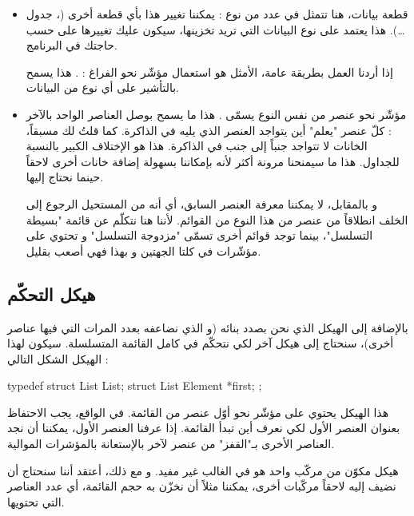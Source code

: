 \begin{itemize}
	\item قطعة بيانات، هنا تتمثل في عدد من نوع 
	 :
	يمكننا تغيير هذا بأي قطعة أخرى
	(،
	جدول \dots). هذا يعتمد على نوع البيانات التي تريد تخزينها، سيكون عليك تغييرها على حسب حاجتك في البرنامج.
	
	\begin{information}
		إذا أردنا العمل بطريقة عامة، الأمثل هو استعمال مؤشّر نحو الفراغ :
		.
		هذا يسمح بالتأشير على أي نوع من البيانات.
	\end{information}
	\item مؤشّر نحو عنصر من نفس النوع يسمّى
	\InlineCode{next}.
	هذا ما يسمح بوصل العناصر الواحد بالآخر : كلّ عنصر "يعلم" أين يتواجد العنصر الذي يليه في الذاكرة. كما قلتُ لك مسبقاً، الخانات لا تتواجد جنباً إلى جنب في الذاكرة. هذا هو الإختلاف الكبير بالنسبة للجداول. هذا ما سيمنحنا مرونة أكثر لأنه بإمكاننا بسهولة إضافة خانات أخرى لاحقاً حينما نحتاج إليها.

\begin{information}
	و بالمقابل، لا يمكننا معرفة العنصر السابق، أي أنه من المستحيل الرجوع إلى الخلف انطلاقاً من عنصر من هذا النوع من القوائم. لأننا هنا نتكلّم عن قائمة "بسيطة التسلسل"، بينما توجد قوائم أخرى تسمّى "مزدوجة التسلسل" و تحتوي على مؤشّرات في كلتا الجهتين و بهذا فهي أصعب بقليل.
\end{information}
\end{itemize}


\subsection{هيكل التحكّم}

بالإضافة إلى الهيكل الذي نحن بصدد بنائه (و الذي نضاعفه بعدد المرات التي فيها عناصر أخرى)، سنحتاج إلى هيكل آخر لكي نتحكّم في كامل القائمة المتسلسلة. سيكون لهذا الهيكل الشكل التالي :

\begin{Csource}
typedef struct List List;
struct List
{
	Element *first;
};
\end{Csource}

هذا الهيكل
يحتوي على مؤشّر نحو أوّل عنصر من القائمة. في الواقع، يجب الاحتفاظ بعنوان العنصر الأول لكي نعرف أين تبدأ القائمة. إذا عرفنا العنصر الأول، يمكننا أن نجد العناصر الأخرى بـ"القفز" من عنصر لآخر بالإستعانة بالمؤشرات الموالية.

\begin{information}
هيكل مكوّن من مركّب واحد هو في الغالب غير مفيد. و مع ذلك، أعتقد أننا سنحتاج أن نضيف إليه لاحقاً مركّبات أخرى، يمكننا مثلاً أن نخزّن به حجم القائمة، أي عدد العناصر التي تحتويها.
\end{information}

